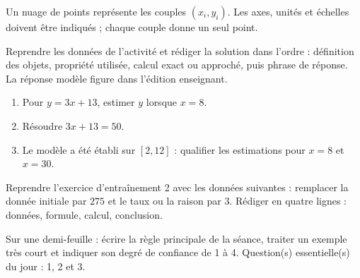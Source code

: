 \begin{traceecrite}Un nuage de points représente les couples $(x_i,y_i)$. Les axes, unités et échelles doivent être indiqués ; chaque couple donne un seul point.\end{traceecrite}

\begin{exemple}
Reprendre les données de l'activité et rédiger la solution dans l'ordre : définition des objets, propriété utilisée, calcul exact ou approché, puis phrase de réponse. La réponse modèle figure dans l'édition enseignant.
\end{exemple}

\begin{exercice}[-- essentiel]
\begin{enumerate}\item Pour $y=3x+13$, estimer $y$ lorsque $x=8$.\item Résoudre $3x+13=50$.\item Le modèle a été établi sur $[2,12]$ : qualifier les estimations pour $x=8$ et $x=30$.\end{enumerate}
\end{exercice}


\begin{dm}Reprendre l'exercice d'entraînement 2 avec les données suivantes : remplacer la donnée initiale par $275$ et le taux ou la raison par $3$. Rédiger en quatre lignes : données, formule, calcul, conclusion.\end{dm}

\begin{sortie}Sur une demi-feuille : écrire la règle principale de la séance, traiter un exemple très court et indiquer son degré de confiance de 1 à 4. Question(s) essentielle(s) du jour : 1, 2 et 3.\end{sortie}

